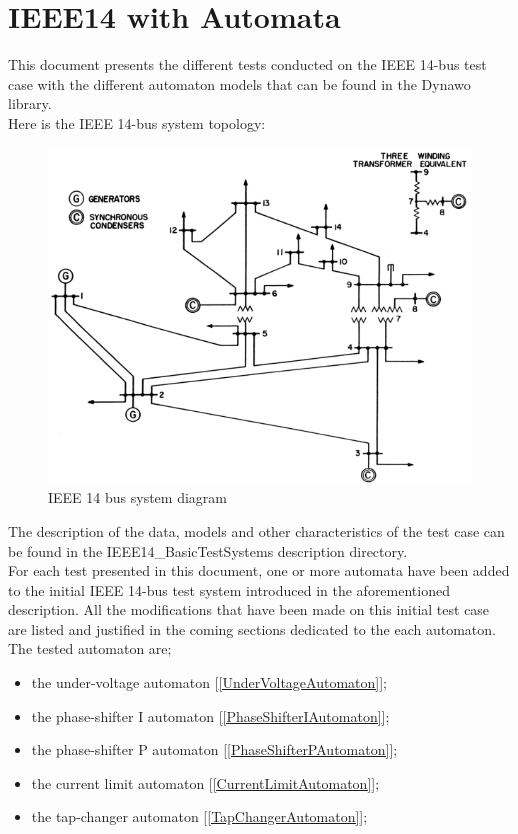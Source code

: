 \documentclass[a4paper, 12pt]{report}
\begin{document}
\chapter{IEEE14 with Automata}

This document presents the different tests conducted on the IEEE 14-bus test case with the different automaton models that can be found in the Dynawo library.\\

Here is the IEEE 14-bus system topology:
\begin{figure}[H]
  \includegraphics[width=\textwidth]{Single-line-diagram-of-IEEE-14-bus-system.png}
  \caption{IEEE 14 bus system diagram}
\end{figure}

The description of the data, models and other characteristics of the test case can be found in the IEEE14\_BasicTestSystems description directory. \\

For each test presented in this document, one or more automata have been added to the initial IEEE 14-bus test system introduced in the aforementioned description. All the modifications that have been made on this initial test case are listed and justified in the coming sections dedicated to the each automaton.\\

The tested automaton are;
\begin{itemize}
\item the under-voltage automaton [\ref{UnderVoltageAutomaton}];
\item the phase-shifter I automaton [\ref{PhaseShifterIAutomaton}];
\item the phase-shifter P automaton [\ref{PhaseShifterPAutomaton}];
\item the current limit automaton [\ref{CurrentLimitAutomaton}];
\item the tap-changer automaton [\ref{TapChangerAutomaton}];
\end{itemize}
\end{document}
